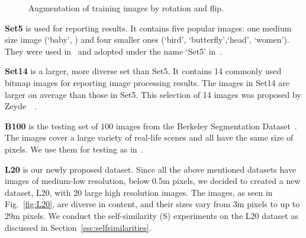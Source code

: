 \documentclass[10pt,twocolumn,letterpaper]{article}
\begin{document}
\begin{figure}
\centering
\scriptsize
\setlength{\tabcolsep}{1pt}     \renewcommand{\arraystretch}{1} 
\caption{Augmentation of training images by rotation and flip.}
\label{fig:augmentation}
\end{figure}

\noindent\textbf{Set5 } is used for reporting results. It contains five popular images: one medium size image (`baby', ) and four smaller ones (`bird', `butterfly',`head', `women').
They were used in~\cite{Bevilacqua-BMVC-2012} and adopted under the name `Set5' in~\cite{Timofte-ICCV-2013}.

\noindent\textbf{Set14 } is a larger, more diverse set than Set5. It contains 14 commonly used bitmap images for reporting image processing results. The images in Set14 are larger on average than those in Set5. This selection of 14 images was proposed by Zeyde~\etal~\cite{Zeyde-CS-2012}.

\noindent\textbf{B100 } is the testing set of 100 images from the Berkeley Segmentation Dataset~\cite{Martin-ICCV-2001}. The images cover a large variety of real-life scenes and all have the same size of  pixels. We use them for testing as in~\cite{Timofte-ACCV-2014}.

\noindent\textbf{L20 } is our newly proposed dataset. Since all the above mentioned datasets have images of medium-low resolution, below 0.5m pixels, we decided to created a new dataset, L20, with 20 large high resolution images. The images, as seen in Fig.~\ref{fig:L20}, are diverse in content, and their sizes vary from 3m pixels to up to 29m pixels. We conduct the self-similarity (S) experiments on the L20 dataset as discussed in Section~\ref{ssc:selfsimilarities}.
\end{document}
